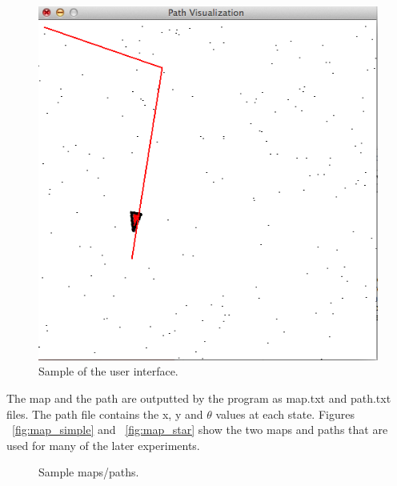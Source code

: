 \documentclass[a4paper,11pt]{report}
\begin{document}
	\begin{figure}[h!]
	  \centering
	    \includegraphics[width=.5\textwidth]{images/interface_agent.png}
	  \caption{Sample of the user interface.}
	  \label{fig:interface_agent}
	\end{figure}
	
	The map and the path are outputted by the program as map.txt and path.txt files. The path file contains the x, y and $\theta$ values at each state. Figures ~\ref{fig:map_simple} and ~\ref{fig:map_star} show the two maps and paths that are used for many of the later experiments.

	\begin{figure}
	\centering
	\caption{Sample maps/paths.}
	\label{fig:simple_sensing}
	\end{figure}
	
\end{document}
